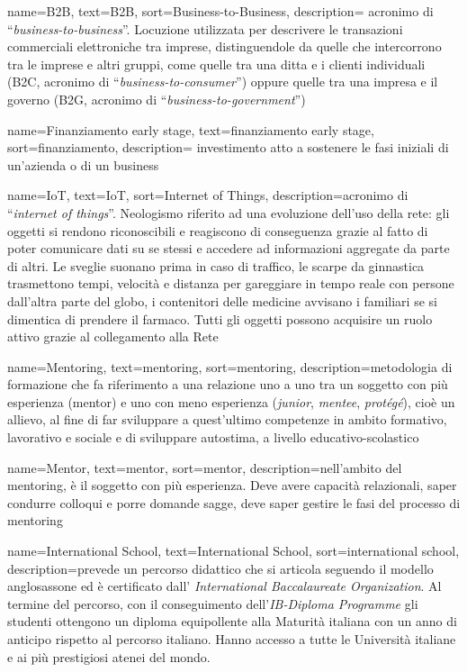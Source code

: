 {
    name=B2B,
    text=B2B,
    sort=Business-to-Business,
    description={ acronimo di “\emph{business-to-business}”. Locuzione utilizzata per descrivere le transazioni commerciali elettroniche tra imprese, distinguendole da quelle che intercorrono tra le imprese e altri gruppi, come quelle tra una ditta e i clienti individuali (B2C, acronimo di “\emph{business-to-consumer}”) oppure quelle tra una impresa e il governo (B2G, acronimo di “\emph{business-to-government}”)}
}

{
    name=Finanziamento early stage,
    text=finanziamento early stage,
    sort=finanziamento,
    description={ investimento atto a sostenere le fasi iniziali di un’azienda o di un business}
}

{
    name=IoT, %
    text=IoT, %
    sort=Internet of Things,
    description={acronimo di “\emph{internet of things}”. Neologismo riferito ad una evoluzione dell'uso della rete: gli oggetti si rendono riconoscibili e reagiscono di conseguenza grazie al fatto di poter comunicare dati su se stessi e accedere ad informazioni aggregate da parte di altri. Le sveglie suonano prima in caso di traffico, le scarpe da ginnastica trasmettono tempi, velocità e distanza per gareggiare in tempo reale con persone dall'altra parte del globo, i contenitori delle medicine avvisano i familiari se si dimentica di prendere il farmaco. 
Tutti gli oggetti possono acquisire un ruolo attivo grazie al collegamento alla Rete}
}

{
    name=Mentoring, %
    text=mentoring, %
    sort=mentoring,
    description={metodologia di formazione che fa riferimento a una relazione uno a uno tra un soggetto con più esperienza (mentor) e uno con meno esperienza (\emph{junior}, \emph{mentee}, \emph{protégé}), cioè un allievo, al fine di far sviluppare a quest'ultimo competenze in ambito formativo, lavorativo e sociale e di sviluppare autostima, a livello educativo-scolastico}
}

{
    name=Mentor, %
    text=mentor, %
    sort=mentor,
    description={nell’ambito del mentoring, è il soggetto con più esperienza. Deve avere capacità relazionali, saper condurre colloqui e porre domande sagge, deve saper gestire le fasi del processo di mentoring}
}

{
    name=International School, %
    text=International School, %
    sort=international school,
    description={prevede un percorso didattico che si articola seguendo il modello anglosassone ed è certificato dall' \emph{International Baccalaureate Organization}. 
Al termine del percorso, con il conseguimento dell'\emph{IB-Diploma Programme} gli studenti ottengono un diploma equipollente alla Maturità italiana con un anno di anticipo rispetto al percorso italiano. Hanno accesso a tutte le Università italiane e ai più prestigiosi atenei del mondo.}
}

